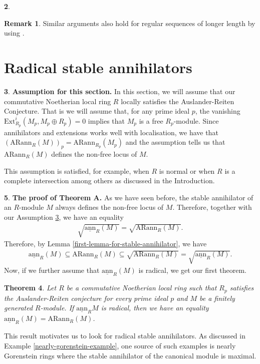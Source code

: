 \documentclass[12pt]{amsart}
\newcommand{\Ext}{\mathrm{Ext}}
\newcommand{\sann}{\underline{\mathrm{ann}}}
\newcommand{\arann}{\mathrm{ARann}}
\newtheorem{theorem}{Theorem}[section]
\theoremstyle{definition}
\newtheorem{remark}[theorem]{Remark}
\newtheorem{chunk}[theorem]{}
\numberwithin{equation}{theorem}
\begin{document}
\begin{chunk}
    \begin{remark}
        Similar arguments also hold for regular sequences of longer length by using \cite[Proposition 2.2]{takahashi-thick}.
    \end{remark}
\end{chunk}
\iffalse


\section{Radical stable annihilators}


\begin{chunk}\label{assumption-for-section-three}
    \textbf{Assumption for this section.} 
    In this section, we will assume that our commutative Noetherian local ring $R$ locally satisfies the Auslander-Reiten Conjecture. That is we will assume that, for any prime ideal $p$, the vanishing $\Ext_{R_p}^i(M_p, M_p \oplus R_p) = 0$ implies that $M_p$ is a free $R_p$-module. Since annihilators and extensions works well with localisation, we have that $(\arann_R(M))_p = \arann_{R_p}(M_p)$ and the assumption tells us that $\arann_R(M)$ defines the non-free locus of $M$.

    This assumption is satisfied, for example, when $R$ is normal or when $R$ is a complete intersection among others as discussed in the Introduction. 
\end{chunk}

\begin{chunk}
    \textbf{The proof of Theorem A.} As we have seen before, the stable annihilator of an $R$-module $M$ always defines the non-free locus of $M$. Therefore, together with our Assumption \ref{assumption-for-section-three}, we have an equality
    \begin{align*}
        \sqrt{\sann_R(M)} = \sqrt{\arann_R(M)}.
    \end{align*}
    Therefore, by Lemma \ref{first-lemma-for-stable-annihilator}, we have 
    \begin{align*}
        \sann_R(M) \subseteq \arann_R(M) \subseteq  \sqrt{\arann_R(M)} =  \sqrt{\sann_R (M)}.
    \end{align*}
    Now, if we further assume that $\sann_R(M)$ is radical, we get our first theorem.
    \begin{theorem}\label{first-main-theorem}
        Let $R$ be a commutative Noetherian local ring such that $R_p$ satisfies the Auslander-Reiten conjecture for every prime ideal $p$ and $M$ be a finitely generated $R$-module. If $\sann_R M$ is radical, then we have an equality $\sann_R(M) = \arann_R(M)$.
    \end{theorem}
    This result motivates us to look for radical stable annihilators. As discussed in Example \ref{nearly-gorenstein-example}, one source of such examples is nearly Gorenstein rings where the stable annihilator of the canonical module is maximal.
\end{chunk}
\end{document}
